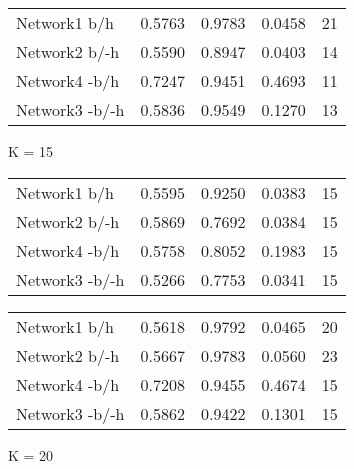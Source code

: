 \begin{table*}[h]
\begin{minipage}[h]{0.45\linewidth}
\begin{tabular}{lrrrr}
 Network1 b/h         &   0.5763 &      0.9783 &   0.0458 & 21 \\
 Network2 b/-h      &   0.5590 &      0.8947 &   0.0403 & 14 \\
 Network4 -b/h       &   0.7247 &      0.9451 &   0.4693 & 11 \\
 Network3 -b/-h     &   0.5836 &      0.9549 &   0.1270 & 13 \\
\hline
\end{tabular}
\end{minipage}


	\begin{minipage}[h]{0.45\linewidth} 
K = 15
\begin{tabular}{lrrrr}

 Network1 b/h           &   0.5595 &      0.9250 &   0.0383 & 15 \\
 Network2 b/-h        &   0.5869 &      0.7692 &   0.0384 & 15 \\
 Network4 -b/h         &   0.5758 &      0.8052 &   0.1983 & 15 \\
 Network3 -b/-h       &   0.5266 &      0.7753 &   0.0341 & 15 \\
\hline
\end{tabular}
\end{minipage}
\hspace{0.5cm}
\begin{minipage}[h]{0.45\linewidth}
\begin{tabular}{lrrrr}

 Network1 b/h         &   0.5618 &      0.9792 &   0.0465 & 20 \\
 Network2 b/-h      &   0.5667 &      0.9783 &   0.0560 & 23 \\
 Network4 -b/h       &   0.7208 &      0.9455 &   0.4674 & 15 \\
 Network3 -b/-h     &   0.5862 &      0.9422 &   0.1301 & 15 \\
\hline
\end{tabular}
\end{minipage}


	\begin{minipage}[h]{0.45\linewidth} 
K = 20
\begin{tabular}{lrrrr}


\end{tabular}
\end{minipage}
\end{table*}
